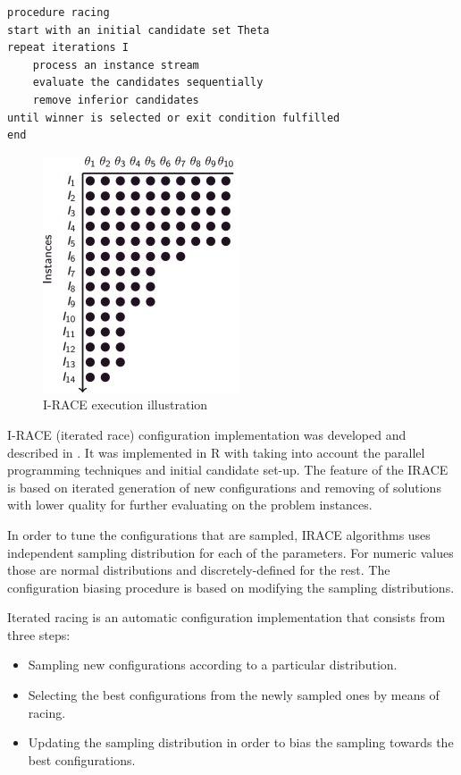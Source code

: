 \documentclass[12pt]{article}
\begin{document}
\begin{minipage}[c, breaklines=true]{0.95\textwidth}
\begin{lstlisting}[caption={General racing pseudo-code}, label={lst:racing}]
procedure racing
start with an initial candidate set Theta
repeat iterations I
	process an instance stream
	evaluate the candidates sequentially
	remove inferior candidates
until winner is selected or exit condition fulfilled
end
\end{lstlisting}
\end{minipage}

\begin{figure}[H]
  \centering
    \includegraphics[scale=1.2]{irace.jpg}
  \caption{I-RACE execution illustration}
  \label{fig:irace}
\end{figure}


I-RACE (iterated race) configuration implementation was developed and described in \cite{iraceaac}. It was implemented in R with taking into account the parallel programming techniques and initial candidate set-up. The feature of the IRACE is based on iterated generation of new configurations and removing of solutions with lower quality for further evaluating on the problem instances.

In order to tune the configurations that are sampled, IRACE algorithms uses independent sampling distribution for each of the parameters. For numeric values those are normal distributions and discretely-defined for the rest. The configuration biasing procedure is based on modifying the sampling distributions.

Iterated racing is an automatic configuration implementation that consists from three steps:

\begin{itemize}
\item Sampling new configurations according to a particular distribution.
\item Selecting the best configurations from the newly sampled ones by means of racing.
\item Updating the sampling distribution in order to bias the sampling towards the best configurations.
\end{itemize}
\end{document}

